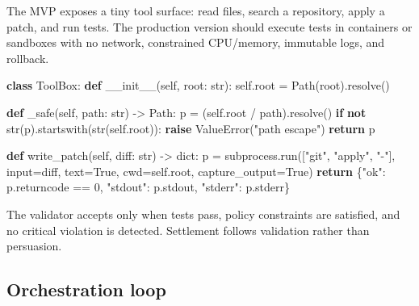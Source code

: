 \documentclass[11pt]{article}
\newenvironment{Shaded}{}{}
\newcommand{\BuiltInTok}[1]{\textcolor[rgb]{0.00,0.50,0.00}{#1}}
\newcommand{\ControlFlowTok}[1]{\textcolor[rgb]{0.00,0.44,0.13}{\textbf{#1}}}
\newcommand{\DecValTok}[1]{\textcolor[rgb]{0.25,0.63,0.44}{#1}}
\newcommand{\FunctionTok}[1]{\textcolor[rgb]{0.02,0.16,0.49}{#1}}
\newcommand{\KeywordTok}[1]{\textcolor[rgb]{0.00,0.44,0.13}{\textbf{#1}}}
\newcommand{\NormalTok}[1]{#1}
\newcommand{\OperatorTok}[1]{\textcolor[rgb]{0.40,0.40,0.40}{#1}}
\newcommand{\PreprocessorTok}[1]{\textcolor[rgb]{0.74,0.48,0.00}{#1}}
\newcommand{\StringTok}[1]{\textcolor[rgb]{0.25,0.44,0.63}{#1}}
\newcommand{\VariableTok}[1]{\textcolor[rgb]{0.10,0.09,0.49}{#1}}
\begin{document}
The MVP exposes a tiny tool surface: read files, search a repository,
apply a patch, and run tests. The production version should execute
tests in containers or sandboxes with no network, constrained
CPU/memory, immutable logs, and rollback.

\begin{Shaded}
\begin{Highlighting}[]
\KeywordTok{class}\NormalTok{ ToolBox:}
    \KeywordTok{def} \FunctionTok{\_\_init\_\_}\NormalTok{(}\VariableTok{self}\NormalTok{, root: }\BuiltInTok{str}\NormalTok{):}
        \VariableTok{self}\NormalTok{.root }\OperatorTok{=}\NormalTok{ Path(root).resolve()}

    \KeywordTok{def}\NormalTok{ \_safe(}\VariableTok{self}\NormalTok{, path: }\BuiltInTok{str}\NormalTok{) }\OperatorTok{{-}\textgreater{}}\NormalTok{ Path:}
\NormalTok{        p }\OperatorTok{=}\NormalTok{ (}\VariableTok{self}\NormalTok{.root }\OperatorTok{/}\NormalTok{ path).resolve()}
        \ControlFlowTok{if} \KeywordTok{not} \BuiltInTok{str}\NormalTok{(p).startswith(}\BuiltInTok{str}\NormalTok{(}\VariableTok{self}\NormalTok{.root)):}
            \ControlFlowTok{raise} \PreprocessorTok{ValueError}\NormalTok{(}\StringTok{"path escape"}\NormalTok{)}
        \ControlFlowTok{return}\NormalTok{ p}

    \KeywordTok{def}\NormalTok{ write\_patch(}\VariableTok{self}\NormalTok{, diff: }\BuiltInTok{str}\NormalTok{) }\OperatorTok{{-}\textgreater{}} \BuiltInTok{dict}\NormalTok{:}
\NormalTok{        p }\OperatorTok{=}\NormalTok{ subprocess.run([}\StringTok{"git"}\NormalTok{, }\StringTok{"apply"}\NormalTok{, }\StringTok{"{-}"}\NormalTok{], }\BuiltInTok{input}\OperatorTok{=}\NormalTok{diff, text}\OperatorTok{=}\VariableTok{True}\NormalTok{,}
\NormalTok{                           cwd}\OperatorTok{=}\VariableTok{self}\NormalTok{.root, capture\_output}\OperatorTok{=}\VariableTok{True}\NormalTok{)}
        \ControlFlowTok{return}\NormalTok{ \{}\StringTok{"ok"}\NormalTok{: p.returncode }\OperatorTok{==} \DecValTok{0}\NormalTok{, }\StringTok{"stdout"}\NormalTok{: p.stdout, }\StringTok{"stderr"}\NormalTok{: p.stderr\}}
\end{Highlighting}
\end{Shaded}

The validator accepts only when tests pass, policy constraints are
satisfied, and no critical violation is detected. Settlement follows
validation rather than persuasion.

\subsection{Orchestration loop}\label{orchestration-loop}
\end{document}
